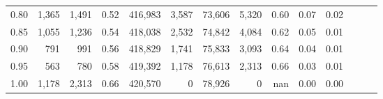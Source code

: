 \begin{tabular}{rrrrrrrrrrrrrr}
0.80 &   1,365 &  1,491 &  0.52 &  416,983 &    3,587 &  73,606 &   5,320 &  0.60 &  0.07 &      0.02 \\
0.85 &   1,055 &  1,236 &  0.54 &  418,038 &    2,532 &  74,842 &   4,084 &  0.62 &  0.05 &      0.01 \\
0.90 &     791 &    991 &  0.56 &  418,829 &    1,741 &  75,833 &   3,093 &  0.64 &  0.04 &      0.01 \\
0.95 &     563 &    780 &  0.58 &  419,392 &    1,178 &  76,613 &   2,313 &  0.66 &  0.03 &      0.01 \\
1.00 &   1,178 &  2,313 &  0.66 &  420,570 &        0 &  78,926 &       0 &   nan &  0.00 &      0.00 \\
\bottomrule
\end{tabular}
